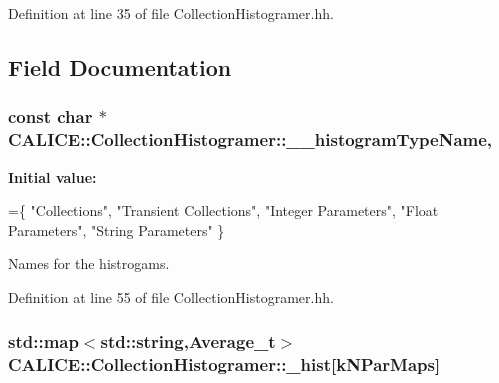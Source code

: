Definition at line 35 of file Collection\-Histogramer.\-hh.



\subsection{Field Documentation}
\subsubsection[{\-\_\-\-\_\-histogram\-Type\-Name}]{\setlength{\rightskip}{0pt plus 5cm}const char $\ast$ C\-A\-L\-I\-C\-E\-::\-Collection\-Histogramer\-::\-\_\-\-\_\-histogram\-Type\-Name\hspace{0.3cm}{\ttfamily [static]}, {\ttfamily [protected]}}\label{classCALICE_1_1CollectionHistogramer_a81e846127f3559c1e127748408ced91d}
{\bfseries Initial value\-:}
\begin{DoxyCode}
=\{
    \textcolor{stringliteral}{"Collections"}, 
    \textcolor{stringliteral}{"Transient Collections"},
    \textcolor{stringliteral}{"Integer Parameters"},
    \textcolor{stringliteral}{"Float Parameters"},
    \textcolor{stringliteral}{"String Parameters"}
  \}
\end{DoxyCode}


Names for the histrogams. 



Definition at line 55 of file Collection\-Histogramer.\-hh.

\subsubsection[{\-\_\-hist}]{\setlength{\rightskip}{0pt plus 5cm}std\-::map$<$std\-::string,Average\-\_\-t$>$ C\-A\-L\-I\-C\-E\-::\-Collection\-Histogramer\-::\-\_\-hist[k\-N\-Par\-Maps]\hspace{0.3cm}{\ttfamily [protected]}}\label{classCALICE_1_1CollectionHistogramer_a9f492bba67d841ac03bdf3beeb646d8e}


